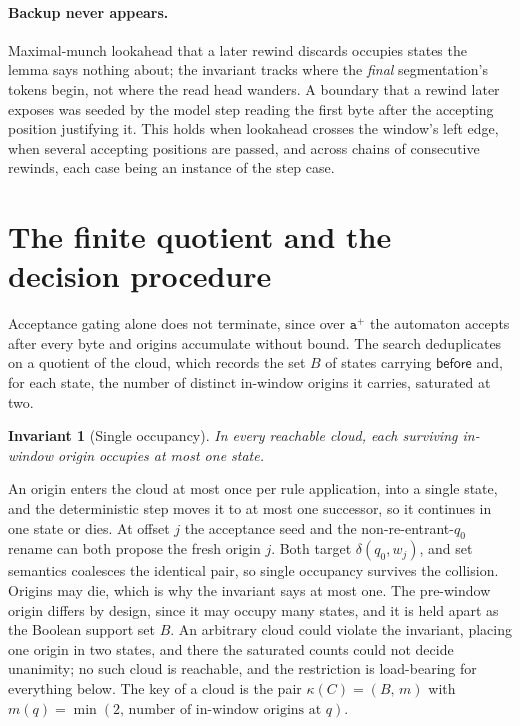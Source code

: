 \documentclass[11pt,a4paper]{article}
\theoremstyle{definition}
\theoremstyle{plain}
\newtheorem{invariant}{Invariant}
\newcommand{\code}[1]{\texttt{#1}}
\newcommand{\before}{\mathsf{before}}
\begin{document}
\paragraph{Backup never appears.} Maximal-munch lookahead that a later rewind discards occupies states the lemma says
nothing about; the invariant tracks where the \emph{final} segmentation's tokens begin, not where the read head wanders.
A boundary that a rewind later exposes was seeded by the model step reading the first byte after the accepting position
justifying it. This holds when lookahead crosses the window's left edge, when several accepting positions are passed,
and across chains of consecutive rewinds, each case being an instance of the step case.

\section{The finite quotient and the decision procedure}
\label{sec:quotient}

Acceptance gating alone does not terminate, since over $\code{a}^+$ the automaton accepts after every byte and origins
accumulate without bound. The search deduplicates on a quotient of the cloud, which records the set $B$ of states
carrying $\before$ and, for each state, the number of distinct in-window origins it carries, saturated at two.

\begin{invariant}[Single occupancy]
\label{inv:single}
In every reachable cloud, each surviving in-window origin occupies at most one state.
\end{invariant}

An origin enters the cloud at most once per rule application, into a single state, and the deterministic step moves it
to at most one successor, so it continues in one state or dies. At offset $j$ the acceptance seed and the
non-re-entrant-$q_0$ rename can both propose the fresh origin $j$. Both target $\delta(q_0, w_j)$, and set semantics
coalesces the identical pair, so single occupancy survives the collision. Origins may die, which is why the invariant
says at most one. The pre-window origin differs by design, since it may occupy many states, and it is held apart as the
Boolean support set $B$. An arbitrary cloud could violate the invariant, placing one origin in two states, and there the
saturated counts could not decide unanimity; no such cloud is reachable, and the restriction is load-bearing for
everything below. The key of a cloud is the pair $\kappa(C) = (B,\, m)$ with
$m(q) = \min(2,\, \text{number of in-window origins at } q)$.
\end{document}
